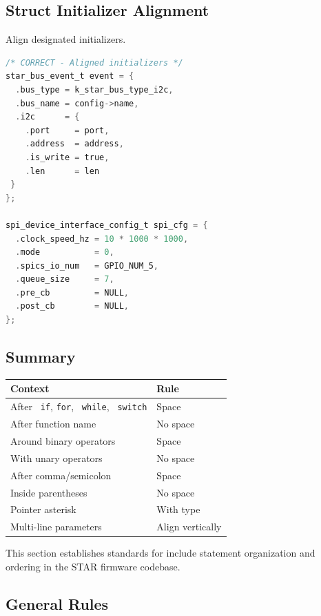 \subsection{Struct Initializer Alignment}

Align designated initializers.

\begin{lstlisting}[language=C]
/* CORRECT - Aligned initializers */
star_bus_event_t event = {
  .bus_type = k_star_bus_type_i2c,
  .bus_name = config->name,
  .i2c      = {
    .port     = port,
    .address  = address,
    .is_write = true,
    .len      = len
 }
};

spi_device_interface_config_t spi_cfg = {
  .clock_speed_hz = 10 * 1000 * 1000,
  .mode           = 0,
  .spics_io_num   = GPIO_NUM_5,
  .queue_size     = 7,
  .pre_cb         = NULL,
  .post_cb        = NULL,
};
\end{lstlisting}

\subsection{Summary}

\begin{center}
\begin{tabular}{|l|l|}
\hline
\textbf{Context} & \textbf{Rule} \\
\hline
After \texttt{
      if}, \texttt{for}, \texttt{
      while}, \texttt{
      switch} & Space \\
\hline
After function name & No space \\
\hline
Around binary operators & Space \\
\hline
With unary operators & No space \\
\hline
After comma/semicolon & Space \\
\hline
Inside parentheses & No space \\
\hline
Pointer asterisk & With type \\
\hline
Multi-line parameters & Align vertically \\
\hline
\end{tabular}
\end{center}



This section establishes standards for include statement organization and ordering in the STAR firmware codebase.

\subsection{General Rules}

